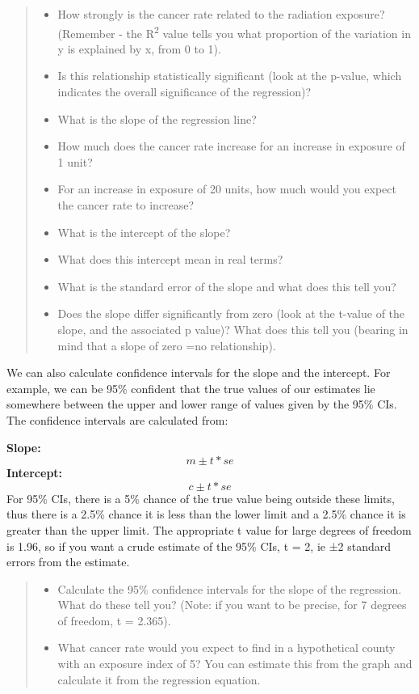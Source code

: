 \documentclass[
]{book}
\providecommand{\tightlist}{%
  \setlength{\itemsep}{0pt}\setlength{\parskip}{0pt}}
\begin{document}
\begin{quote}
\begin{itemize}
\tightlist
\item
  How strongly is the cancer rate related to the radiation exposure? (Remember - the R\textsuperscript{2} value tells you what proportion of the variation in y is explained by x, from 0 to 1).
\item
  Is this relationship statistically significant (look at the p-value, which indicates the overall significance of the regression)?
\item
  What is the slope of the regression line?
\item
  How much does the cancer rate increase for an increase in exposure of 1 unit?
\item
  For an increase in exposure of 20 units, how much would you expect the cancer rate to increase?
\item
  What is the intercept of the slope?
\item
  What does this intercept mean in real terms?
\item
  What is the standard error of the slope and what does this tell you?
\item
  Does the slope differ significantly from zero (look at the t-value of the slope, and the associated p value)? What does this tell you (bearing in mind that a slope of zero =no relationship).
\end{itemize}
\end{quote}

We can also calculate confidence intervals for the slope and the intercept. For example, we can be 95\% confident that the true values of our estimates lie somewhere between the upper and lower range of values given by the 95\% CIs. The confidence intervals are calculated from:

\textbf{Slope:}
\[
m ± t*se 
\]
\textbf{Intercept:}
\[
c ± t*se
\]
For 95\% CIs, there is a 5\% chance of the true value being outside these limits, thus there is a 2.5\% chance it is less than the lower limit and a 2.5\% chance it is greater than the upper limit. The appropriate t value for large degrees of freedom is 1.96, so if you want a crude estimate of the 95\% CIs, t = 2, ie ±2 standard errors from the estimate.

\begin{quote}
\begin{itemize}
\tightlist
\item
  Calculate the 95\% confidence intervals for the slope of the regression. What do these tell you? (Note: if you want to be precise, for 7 degrees of freedom, t = 2.365).
\item
  What cancer rate would you expect to find in a hypothetical county with an exposure index of 5? You can estimate this from the graph and calculate it from the regression equation.
\end{itemize}
\end{quote}
\end{document}
